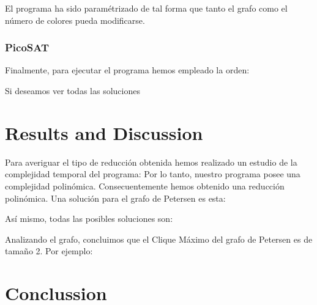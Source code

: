 \documentclass{article}
\begin{document}
        El programa ha sido paramétrizado de tal forma que tanto el grafo como el número de colores pueda modificarse. 
    
    \subsubsection{PicoSAT}
        Finalmente, para ejecutar el programa hemos empleado la orden: 
        \[\]

        Si deseamos ver todas las soluciones 
        \[\]


\section{Results and Discussion}
    Para averiguar el tipo de reducción obtenida hemos realizado un estudio de la complejidad temporal del programa: 
    Por lo tanto, nuestro programa posee una complejidad polinómica. Consecuentemente hemos obtenido una reducción polinómica.
    Una solución para el grafo de Petersen es esta: 

    Así mismo, todas las posibles soluciones son: 
    
    Analizando el grafo, concluimos que el Clique Máximo del grafo de Petersen es de tamaño 2. Por ejemplo: 
    
    


\section{Conclussion}
 

\end{document}
